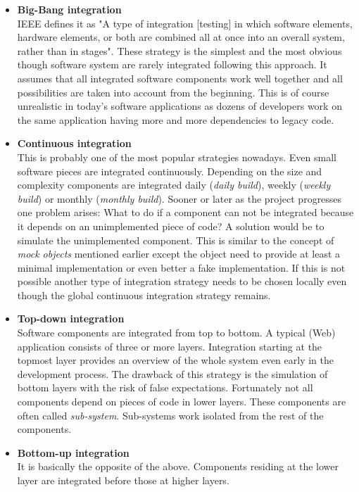 \documentclass[12pt, notitlepage]{article}
\begin{document}
\begin{itemize}
	\item \textbf{Big-Bang integration}\\
	IEEE defines it as\cite{ieee-definition} "A type of integration [testing] in which software elements, hardware elements, or both are combined all at once into an overall system, rather than in stages". These strategy is the simplest and the most obvious though software system are rarely integrated following this approach. It assumes that all integrated software components work well together and all possibilities are taken into account from the beginning. This is of course
unrealistic in today's software applications as dozens of developers work on the same application having more and more dependencies to legacy code. 
	\item \textbf{Continuous integration}\\
	This is probably one of the most popular strategies nowadays. Even small software pieces are integrated continuously. Depending on the 
	size and complexity components are integrated daily (\textit{daily build}), weekly (\textit{weekly build}) or monthly (\textit{monthly build}). 
	Sooner or later as the project progresses one problem arises: What to do if a component can not be integrated because it depends on an unimplemented 
	piece of code? A solution would be to simulate the unimplemented component. This is similar to the concept of \textit{mock objects} mentioned earlier 
	except the object need to provide at least a minimal implementation or even better a fake implementation. If this is not possible another type of integration 
	strategy needs to be chosen locally even though the global continuous integration strategy remains. 
	\item \textbf{Top-down integration}\\
	Software components are integrated from top to bottom. A typical (Web) application consists of three or more layers. Integration starting at the topmost layer
	provides an overview of the whole system even early in the development process. The drawback of this strategy is the simulation of bottom layers with the risk
	of false expectations. Fortunately not all components depend on pieces of code in lower layers. These components are often called
	\textit{sub-system}\cite{sw-testing-quality-assurance}. Sub-systems work isolated from the rest of the components. 
	\item \textbf{Bottom-up integration}\\
	It is basically the opposite of the above. Components residing at the lower layer are integrated before those at higher layers. 

\end{itemize}
\end{document}
